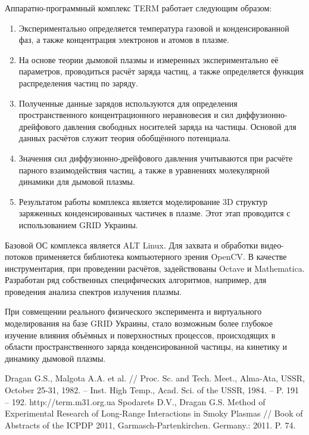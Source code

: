 \documentclass[10pt, a5paper]{article}
\begin{document}
Аппаратно-программный комплекс TERM работает следующим образом:
\begin{enumerate}
	\item Экспериментально определяется температура газовой и конденсированной фаз, а также концентрация электронов и атомов в плазме.
	\item На основе теории дымовой плазмы и измеренных экспериментально её параметров, проводиться расчёт заряда частиц, а также определяется функция распределения частиц по заряду.
	\item Полученные данные зарядов используются для определения пространственного концентрационного неравновесия и сил \linebreak диффузионно-дрейфового давления свободных носителей заряда на частицы. Основой для данных расчётов служит теория обобщённого потенциала.
	\item Значения сил диффузионно-дрейфового давления учитываются при  расчёте парного взаимодействия частиц, а также в уравнениях молекулярной динамики для дымовой плазмы.
	\item Результатом работы комплекса является моделирование 3D структур заряженных конденсированных частичек в плазме. Этот этап проводится с использованием GRID Украины.
\end{enumerate}
Базовой ОС комплекса является ALT Linux. Для захвата и обработки видео-потоков применяется библиотека компьютерного зрения OpenCV. В качестве инструментария, при проведении расчётов, задействованы Octave и Mathematica. Разработан ряд собственных специфических алгоритмов, например, для проведения анализа спектров излучения плазмы. 

При совмещении реального физического эксперимента и виртуального моделирования на базе GRID Украины, стало возможным более глубокое изучение влияния объёмных и поверхностных процессов, происходящих в области пространственного заряда конденсированной частицы, на кинетику и динамику дымовой плазмы.
\begin{thebibliography}{9}
	Dragan G.S., Malgota A.A. et al. // Proc. Sc. and Tech. Meet., Alma-Ata, USSR, October 25-31, 1982. – Inst. High Temp., Acad. Sci. of the USSR, 1984. – P. 191 – 192. 
	 http://term.m31.org.ua
	 Spodarets D.V., Dragan G.S. Method of Experimental Research of Long-Range Interactions in Smoky Plasmas // Book of Abstracts of the ICPDP 2011, Garmasch-Partenkirchen. Germany.: 2011. P. 74. 
\end{thebibliography}
\end{document}
